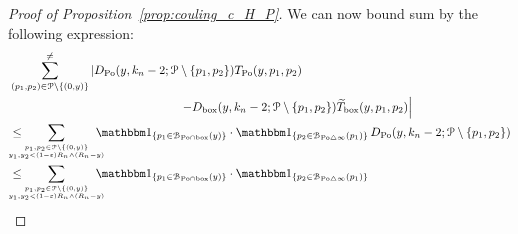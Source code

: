 \begin{proof}[Proof of Proposition~\ref{prop:couling_c_H_P}]
We can now bound sum by the following expression:
\begin{align} 
	&\sum_{(p_1,p_2) \in \Pcal \setminus \{(0,y)\}}^{\not =} 
	  \left| D_{\Po}(y,k_n-2; \Pcal \setminus \{p_1,p_2 \}) T_{\Po} (y,p_1,p_2) \right. \notag \\
	& \hspace{5cm} \left. - D_{\text{box}} (y,k_n-2;\Pcal \setminus \{p_1,p_2\}) \widetilde{T}_{\text{box}} (y,p_1,p_2)
	   \right|  \notag \\
	&\le \hspace{-15pt} \sum_{p_1,p_2\in \Pcal \setminus \{(0,y)\} \atop  y_1, y_2 < (1-\eps)R_n \wedge (R_n-y)} 
		\hspace{-10pt} \ind{p_1 \in \BallInter{y}} \cdot \ind{p_2 \in \BallSym{p_1}} 
		\, D_{\Po} (y,k_n-2;\Pcal \setminus \{ p_1,p_2\}) \label{eq:sum_1}\\
	&\le \hspace{-15pt} \sum_{p_1,p_2\in \Pcal \setminus \{(0,y)\} \atop  y_1, y_2 < (1-\eps)R_n \wedge (R_n-y)} 
		\hspace{-10pt} \ind{p_1 \in \BallInter{y}} \cdot \ind{p_2 \in \BallSym{p_1}} 

\end{align}
\end{proof}
